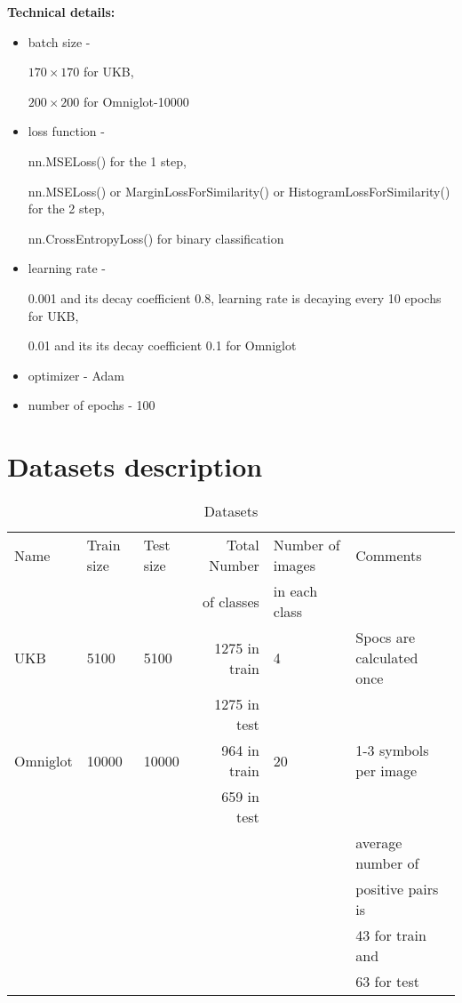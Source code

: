\documentclass[a4paper,12pt]{extreport}
\begin{document}
    \textbf{Technical details:}
    \begin{itemize}
        \item{batch size -

        $170 \times 170$ for UKB,

        $200 \times 200$ for Omniglot-10000}
        \item{loss function -

        nn.MSELoss() for the 1 step,

        nn.MSELoss() or MarginLossForSimilarity() or HistogramLossForSimilarity() for the 2 step,

        nn.CrossEntropyLoss() for binary classification}
        \item{learning rate -

        0.001 and its decay coefficient 0.8, learning rate is decaying every 10 epochs for UKB,

        0.01 and its its decay coefficient 0.1 for Omniglot}
        \item{optimizer - Adam}
        \item{number of epochs - 100}
    \end{itemize}

    \section{Datasets description}\label{sec:datasetsDescription}

    \begin{table}[h!]
        \begin{tabular}{|l|l|l|r|l|l|}
            \hline
            Name & Train size & Test size & Total Number & Number of images & Comments                  \\
            & & & of classes & in each class &                           \\ \hline
            UKB & 5100 & 5100 & 1275 in train & 4 & Spocs are calculated once \\
            & & & 1275 in test & & \\ \hline
            Omniglot & 10000 & 10000 & 964 in train & 20 & 1-3 symbols per image      \\
            & & & 659 in test & &       \\
            & & & & & average number of \\
            & & & & & positive pairs is \\
            & & & & & 43 for train and  \\
            & & & & & 63 for test  \\ \hline
        \end{tabular}
        \caption{Datasets}
        \label{table:datasets_table}
    \end{table}
\end{document}
